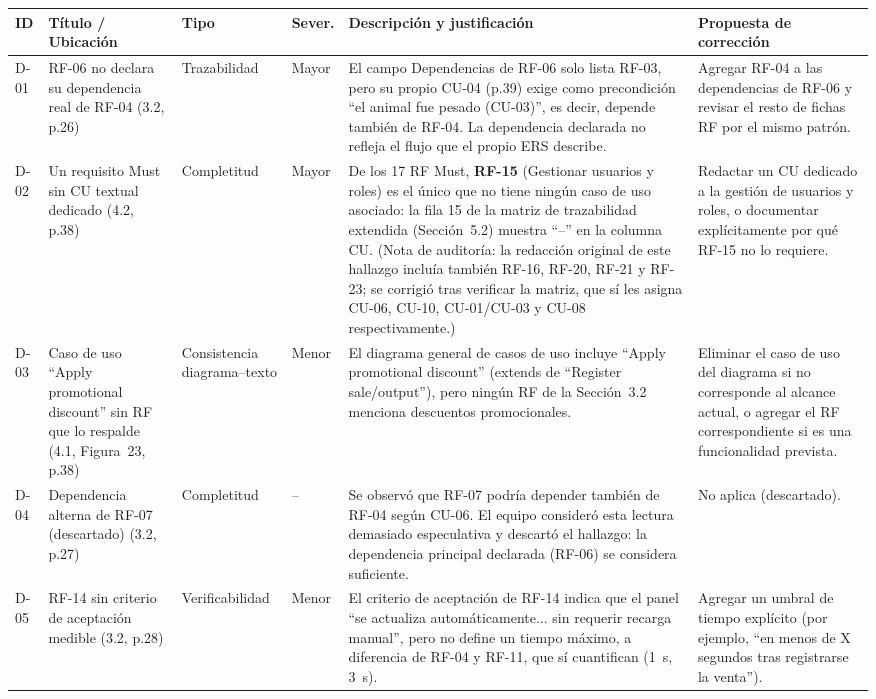 \documentclass[11pt,a4paper]{article}
\begin{document}
\begin{longtable}{|p{0.6cm}|p{3cm}|p{2.5cm}|p{0.9cm}|p{4.3cm}|p{1.8cm}|}
\hline
\textbf{ID} & \textbf{Título / Ubicación} & \textbf{Tipo} & \textbf{Sever.} & \textbf{Descripción y justificación} & \textbf{Propuesta de corrección} \\
\hline
D-01 & RF-06 no declara su dependencia real de RF-04 (3.2, p.26) & Trazabilidad & Mayor & El campo Dependencias de RF-06 solo lista RF-03, pero su propio CU-04 (p.39) exige como precondición ``el animal fue pesado (CU-03)'', es decir, depende también de RF-04. La dependencia declarada no refleja el flujo que el propio ERS describe. & Agregar RF-04 a las dependencias de RF-06 y revisar el resto de fichas RF por el mismo patrón. \\
\hline
D-02 & Un requisito Must sin CU textual dedicado (4.2, p.38) & Completitud & Mayor & De los 17 RF Must, \textbf{RF-15} (Gestionar usuarios y roles) es el único que no tiene ningún caso de uso asociado: la fila 15 de la matriz de trazabilidad extendida (Sección~5.2) muestra ``--'' en la columna CU. (Nota de auditoría: la redacción original de este hallazgo incluía también RF-16, RF-20, RF-21 y RF-23; se corrigió tras verificar la matriz, que sí les asigna CU-06, CU-10, CU-01/CU-03 y CU-08 respectivamente.) & Redactar un CU dedicado a la gestión de usuarios y roles, o documentar explícitamente por qué RF-15 no lo requiere. \\
\hline
D-03 & Caso de uso ``Apply promotional discount'' sin RF que lo respalde (4.1, Figura~23, p.38) & Consistencia diagrama--texto & Menor & El diagrama general de casos de uso incluye ``Apply promotional discount'' (extends de ``Register sale/output''), pero ningún RF de la Sección~3.2 menciona descuentos promocionales. & Eliminar el caso de uso del diagrama si no corresponde al alcance actual, o agregar el RF correspondiente si es una funcionalidad prevista. \\
\hline
D-04 & Dependencia alterna de RF-07 (descartado) (3.2, p.27) & Completitud & -- & Se observó que RF-07 podría depender también de RF-04 según CU-06. El equipo consideró esta lectura demasiado especulativa y descartó el hallazgo: la dependencia principal declarada (RF-06) se considera suficiente. & No aplica (descartado). \\
\hline
D-05 & RF-14 sin criterio de aceptación medible (3.2, p.28) & Verificabilidad & Menor & El criterio de aceptación de RF-14 indica que el panel ``se actualiza automáticamente... sin requerir recarga manual'', pero no define un tiempo máximo, a diferencia de RF-04 y RF-11, que sí cuantifican (1~s, 3~s). & Agregar un umbral de tiempo explícito (por ejemplo, ``en menos de X segundos tras registrarse la venta''). \\

\end{longtable}
\end{document}

